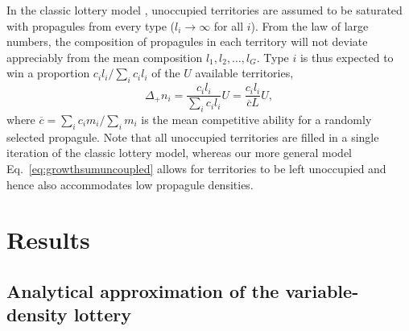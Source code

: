 \documentclass[12pt]{article}
\begin{document}
In the classic lottery model \citep{chesson_1981}, unoccupied territories are assumed to be saturated with propagules from every type ($l_i\rightarrow \infty$ for all $i$). From the law of large numbers, the composition of propagules in each territory will not deviate appreciably from the mean composition $l_1,l_2,\ldots,l_G$. Type $i$ is thus expected to win a proportion $c_i l_i/\sum_i c_i l_i$ of the $U$ available territories,
\begin{equation}
\Delta_+ n_i=\frac{c_i l_i}{\sum_i c_i l_i}U=\frac{c_i l_i}{\overline{c}L}U, \label{eq:lottery}
\end{equation}
where $\overline{c}=\sum_i c_i m_i/\sum_i m_i$ is the mean competitive ability for a randomly selected propagule. Note that all unoccupied territories are filled in a single iteration of the classic lottery model, whereas our more general model Eq.~\eqref{eq:growthsumuncoupled} allows for territories to be left unoccupied and hence also accommodates low propagule densities.

\section*{Results}

\subsection*{Analytical approximation of the variable-density lottery}
\end{document}
